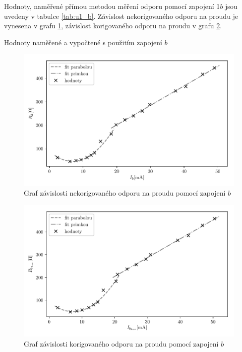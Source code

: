 \documentclass[0-protokol.tex]{subfiles}
\begin{document}
Hodnoty, naměřené přímou metodou měření odporu pomocí zapojení 1$b$ jsou uvedeny v tabulce \ref{tab:u1_b}. Závislost nekorigovaného odporu na proudu je vynesena v grafu \ref{fig:u1_b}, závislost korigovaného odporu na proudu v grafu \ref{fig:u1_b_kor}.

\begin{table}[H]
\centering
\setlength{\tabcolsep}{10pt}

\caption{Hodnoty naměřené a vypočtené s použitím zapojení $b$}
\label{tab:u1_b}
\end{table}

\begin{figure}[H] 
\centering
\includegraphics[]{plot/u1_b}
\caption{Graf závislosti nekorigovaného odporu na proudu pomocí zapojení $b$}
\label{fig:u1_b}
\end{figure}

\begin{figure}[H] 
\centering
\includegraphics[]{plot/u1_b_kor}
\caption{Graf závislosti korigovaného odporu na proudu pomocí zapojení $b$}
\label{fig:u1_b_kor}
\end{figure}
\end{document}
